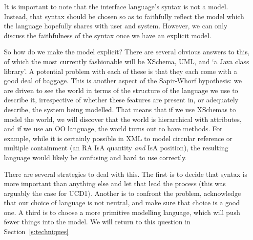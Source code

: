 \documentclass[11pt,twoside]{article}
\begin{document}
It is important to note that the interface language's syntax is not a
model.  Instead, that syntax should be chosen so as to faithfully
reflect the model which the language hopefully shares with user and
system.  However, we can only discuss the faithfulness of the syntax
once we have an explicit model.

So how do we make the model explicit?  There are several obvious
answers to this, of which the most currently fashionable will be
XSchema, UML, and `a Java class library'.  A potential problem with
each of these is that they each come with a good deal of baggage.
%
This is another aspect of the Sapir-Whorf hypothesis: we are driven to
see the world in terms of the structure of the language we use to
describe it, irrespective of whether these features are present in, or
adequately describe, the
system being modelled.
That means that if we use XSchemas to model the world, we will
discover that the world is hierarchical with attributes, and if we use
an OO language, the world turns out to have methods.  For example,
while it is certainly possible in XML to model circular reference or
multiple containment (an RA IsA quantity \emph{and} IsA position), the
resulting language would likely be confusing and hard to use
correctly.
%


There are several strategies to deal with this.  The first is to
decide that syntax is more important than anything else and let that
lead the process (this was arguably the case for UCD1).  Another is to confront
the problem, acknowledge that our choice of language is not neutral,
and make sure that choice is a good one.  A third is to choose a
more primitive modelling language, which will push fewer things into
the model.  We will return to this question in Section~\ref{s:techniques}
\end{document}
